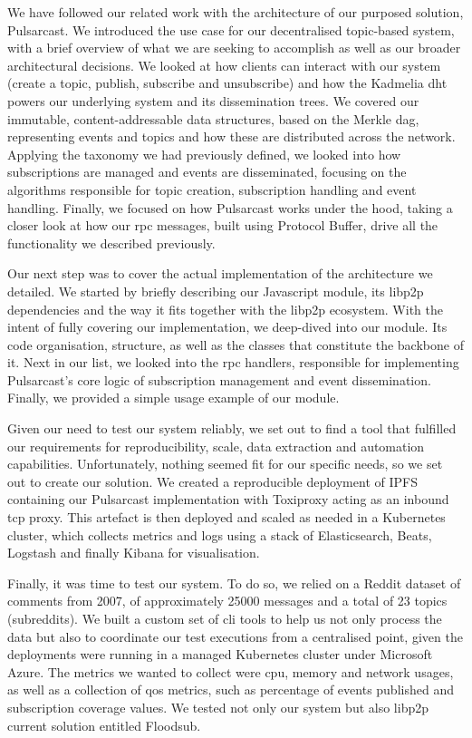 We have followed our related work with the architecture of our purposed
solution, Pulsarcast. We introduced the use case for our decentralised
topic-based system, with a brief overview of what we are seeking to accomplish
as well as our broader architectural decisions. We looked at how clients can
interact with our system (create a topic, publish, subscribe and unsubscribe)
and how the Kadmelia \acrshort{dht} powers our underlying system and its
dissemination trees. We covered our immutable, content-addressable data
structures, based on the Merkle \acrshort{dag}, representing events and topics
and how these are distributed across the network. Applying the taxonomy we had
previously defined, we looked into how subscriptions are managed and events are
disseminated, focusing on the algorithms responsible for topic creation,
subscription handling and event handling. Finally, we focused on how Pulsarcast
works under the hood, taking a closer look at how our \acrshort{rpc} messages,
built using Protocol Buffer, drive all the functionality we described
previously.

Our next step was to cover the actual implementation of the architecture we
detailed. We started by briefly describing our Javascript module, its libp2p
dependencies and the way it fits together with the libp2p ecosystem. With the
intent of fully covering our implementation, we deep-dived into our module. Its
code organisation, structure, as well as the classes that constitute the
backbone of it. Next in our list, we looked into the \acrshort{rpc} handlers,
responsible for implementing Pulsarcast's core logic of subscription management
and event dissemination.  Finally, we provided a simple usage example of our
module.

Given our need to test our system reliably, we set out to find a tool that
fulfilled our requirements for reproducibility, scale, data extraction and
automation capabilities. Unfortunately, nothing seemed fit for our specific
needs, so we set out to create our solution. We created a reproducible
deployment of IPFS containing our Pulsarcast implementation with Toxiproxy
acting as an inbound \acrshort{tcp} proxy. This artefact is then deployed and
scaled as needed in a Kubernetes cluster, which collects metrics and logs using
a stack of Elasticsearch, Beats, Logstash and finally Kibana for visualisation.

Finally, it was time to test our system. To do so, we relied on a Reddit
dataset of comments from 2007, of approximately 25000 messages and a total of
23 topics (subreddits). We built a custom set of \acrshort{cli} tools to help
us not only process the data but also to coordinate our test executions from a
centralised point, given the deployments were running in a managed Kubernetes
cluster under Microsoft Azure. The metrics we wanted to collect were
\acrshort{cpu}, memory and network usages, as well as a collection of
\acrshort{qos} metrics, such as percentage of events published and subscription
coverage values. We tested not only our system but also libp2p current solution
entitled Floodsub.

